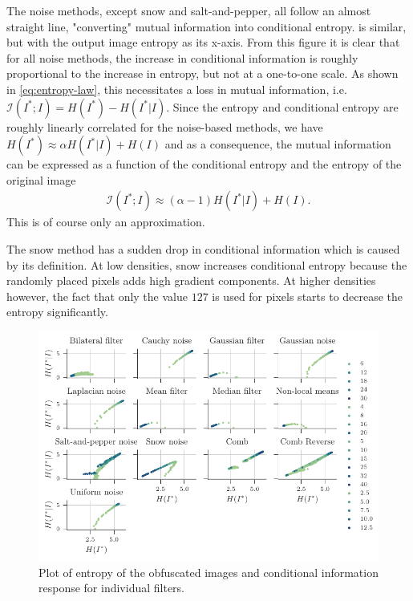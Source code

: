 The noise methods, except snow and salt-and-pepper, all follow an almost straight line, "converting" mutual information into conditional entropy.  is similar, but with the output image entropy as its x-axis. From this figure it is clear that for all noise methods, the increase in conditional information is roughly proportional to the increase in entropy, but not at a one-to-one scale. As shown in \cref{eq:entropy-law}, this necessitates a loss in mutual information, i.e. $\mathcal{I}(I^*;I) = H(I^*) - H(I^*|I)$. Since the entropy and conditional entropy are roughly linearly correlated for the noise-based methods, we have $H(I^*) \approx \alpha H(I^*|I) + H(I)$ and as a consequence, the mutual information can be expressed as a function of the conditional entropy and the entropy of the original image 
\begin{align*}
\mathcal{I}(I^*;I) \approx (\alpha-1)H(I^*|I) + H(I).
\end{align*}
This is of course only an approximation.

The snow method has a sudden drop in conditional information which is caused by its definition. At low densities, snow increases conditional entropy because the randomly placed pixels adds high gradient components. At higher densities however, the fact that only the value $127$ is used for pixels starts to decrease the entropy significantly. %

\begin{figure}
	\centering
	
	\includegraphics[width=1\textwidth]{figures/results/individual-ent}
	
	\caption{Plot of entropy of the obfuscated images and conditional information response for individual filters.}\label{fig:individual-entropy}
\end{figure}

